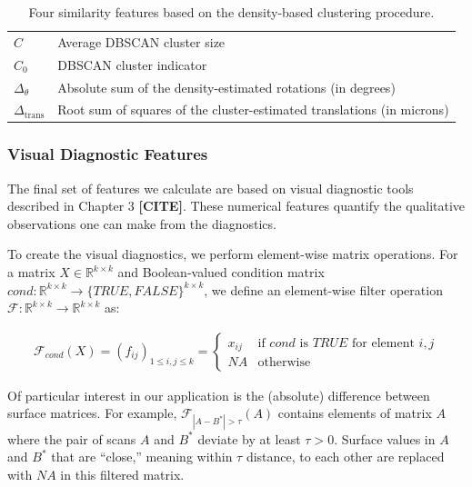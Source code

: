 \documentclass[11pt,]{isuthesis}
\begin{document}
\begin{table}[htbp]
\centering
\begin{tabular}{p{.11\linewidth} p{.7\linewidth}}
$C$ & Average DBSCAN cluster size \\
$C_0$ & DBSCAN cluster indicator \\
$\Delta_\theta$ & Absolute sum of the density-estimated rotations (in degrees) \\
$\Delta_{\text{trans}}$ & Root sum of squares of the cluster-estimated translations (in microns)
\end{tabular}
\caption{Four similarity features based on the density-based clustering procedure.}
\label{tab:dbscanFeatures}
\end{table}

\hypertarget{visual-diagnostic-features}{%
\subsubsection{Visual Diagnostic Features}\label{visual-diagnostic-features}}

The final set of features we calculate are based on visual diagnostic tools described in Chapter 3 \textbf{{[}CITE{]}}.
These numerical features quantify the qualitative observations one can make from the diagnostics.

To create the visual diagnostics, we perform element-wise matrix operations.
For a matrix \(X \in \mathbb{R}^{k \times k}\) and Boolean-valued condition matrix \(cond: \mathbb{R}^{k \times k} \to \{TRUE,FALSE\}^{k \times k}\), we define an element-wise filter operation \(\mathcal{F}: \mathbb{R}^{k \times k} \to \mathbb{R}^{k \times k}\) as:

\begin{align*}
\mathcal{F}_{cond}(X) = 
(f_{ij})_{1 \leq i,j \leq k} =
\begin{cases}
x_{ij} &\text{if $cond$ is $TRUE$ for element $i,j$} \\
NA &\text{otherwise}
\end{cases}
\end{align*}

Of particular interest in our application is the (absolute) difference between surface matrices.
For example, \(\mathcal{F}_{|A - B^*| > \tau}(A)\) contains elements of matrix \(A\) where the pair of scans \(A\) and \(B^*\) deviate by at least \(\tau > 0\).
Surface values in \(A\) and \(B^*\) that are ``close,'' meaning within \(\tau\) distance, to each other are replaced with \(NA\) in this filtered matrix.
\end{document}

